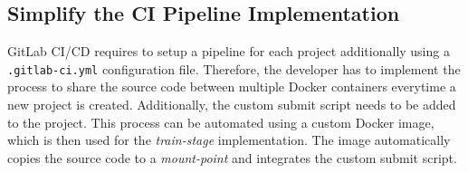 \subsection{Simplify the CI Pipeline Implementation}
GitLab CI/CD requires to setup a pipeline for each project additionally using a \texttt{.gitlab-ci.yml} configuration file.
Therefore, the developer has to implement the process to share the source code between multiple Docker containers everytime a new project is created. Additionally, the custom submit script needs to be added to the project.
This process can be automated using a custom Docker image, which is then used for the \textit{train-stage} implementation. The image automatically copies the source code to a \textit{mount-point} and integrates the custom submit script.